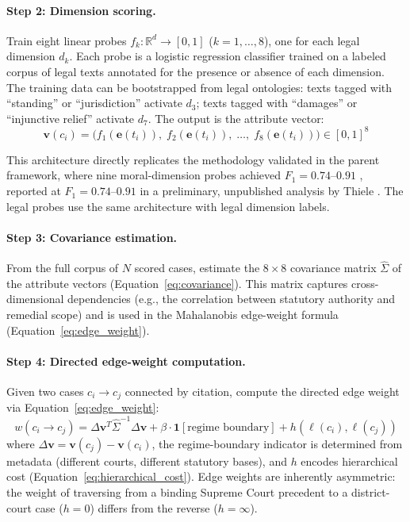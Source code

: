 \documentclass[12pt]{article}
\theoremstyle{definition}
\theoremstyle{remark}
\newcommand{\R}{\mathbb{R}}
\begin{document}
\paragraph{Step 2: Dimension scoring.}  Train eight linear probes $f_k: \R^d \to [0, 1]$ ($k = 1, \ldots, 8$), one for each legal dimension $d_k$.  Each probe is a logistic regression classifier trained on a labeled corpus of legal texts annotated for the presence or absence of each dimension.  The training data can be bootstrapped from legal ontologies: texts tagged with ``standing'' or ``jurisdiction'' activate $d_3$; texts tagged with ``damages'' or ``injunctive relief'' activate $d_7$.  The output is the attribute vector:
\begin{equation}
\mathbf{v}(c_i) = \bigl(f_1(\mathbf{e}(t_i)),\; f_2(\mathbf{e}(t_i)),\; \ldots,\; f_8(\mathbf{e}(t_i))\bigr) \in [0,1]^8
\label{eq:attribute_vector}
\end{equation}

This architecture directly replicates the methodology validated in the parent framework, where nine moral-dimension probes achieved $F_1 = 0.74$--$0.91$ \cite{anon2026a}, reported at $F_1 = 0.74$--$0.91$ in a preliminary, unpublished analysis by Thiele \cite{thiele2026}.  The legal probes use the same architecture with legal dimension labels.

\paragraph{Step 3: Covariance estimation.}  From the full corpus of $N$ scored cases, estimate the $8 \times 8$ covariance matrix $\hat{\Sigma}$ of the attribute vectors (Equation~\ref{eq:covariance}).  This matrix captures cross-dimensional dependencies (e.g., the correlation between statutory authority and remedial scope) and is used in the Mahalanobis edge-weight formula (Equation~\ref{eq:edge_weight}).

\paragraph{Step 4: Directed edge-weight computation.}  Given two cases $c_i \to c_j$ connected by citation, compute the directed edge weight via Equation~\ref{eq:edge_weight}:
\begin{equation}
w(c_i \to c_j) = \Delta \mathbf{v}^T \hat{\Sigma}^{-1} \Delta \mathbf{v} + \beta \cdot \mathbf{1}[\text{regime boundary}] + h(\ell(c_i), \ell(c_j))
\label{eq:edge_weight_nlp}
\end{equation}
where $\Delta \mathbf{v} = \mathbf{v}(c_j) - \mathbf{v}(c_i)$, the regime-boundary indicator is determined from metadata (different courts, different statutory bases), and $h$ encodes hierarchical cost (Equation~\ref{eq:hierarchical_cost}).  Edge weights are inherently asymmetric: the weight of traversing from a binding Supreme Court precedent to a district-court case ($h = 0$) differs from the reverse ($h = \infty$).
\end{document}

